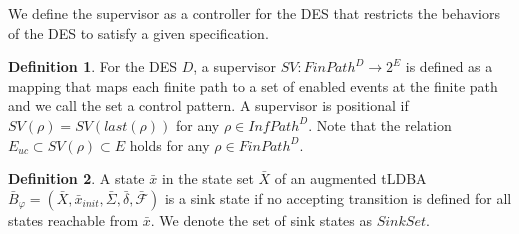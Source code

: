 \documentclass[10 pt, dvipdfmx]{article}
\theoremstyle{definition}
\newtheorem{definition}{Definition}[section]
\begin{document}
We define the supervisor as a controller for the DES that restricts the behaviors of the DES to satisfy a given specification.

\begin{definition}
For the DES $D$, a supervisor $SV : FinPath^{D} \rightarrow 2^E$ is defined as a mapping that maps each finite path to a set of enabled events at the finite path and we call the set a control pattern. A supervisor is positional if $SV(\rho) = SV(last(\rho))$ for any $\rho \in InfPath^D$. Note that the relation $E_{uc} \subset SV(\rho) \subset E$ holds for any $\rho \in FinPath^D$.
\end{definition}


\begin{definition}
  A state $\bar{x}$ in the state set $\bar{X}$ of an augmented tLDBA $\bar{B}_{\varphi} = (\bar{X}, \bar{x}_{init},\bar{\Sigma},\bar{\delta},\bar{\mathcal{F}})$ is a sink state if no accepting transition is defined for all states reachable from $\bar{x}$. We denote the set of sink states as $Sink Set$.
\end{definition}
\end{document}

